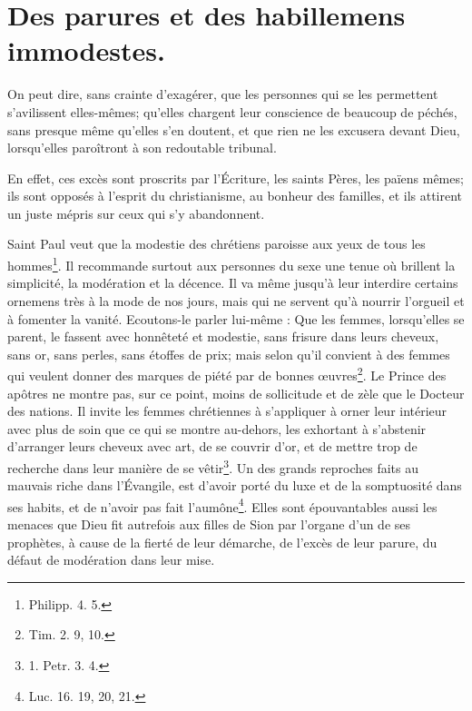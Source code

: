 \documentclass[instructions.tex]{subfiles}
\begin{document}
 
\chapter{Des parures et des habillemens immodestes.}
 
On peut dire, sans crainte d'exagérer, que les personnes qui se les permettent s'avilissent elles-mêmes; qu'elles chargent leur conscience de beaucoup de péchés, sans presque même qu'elles s'en doutent, et que rien ne les excusera devant Dieu, lorsqu'elles paroîtront à son redoutable tribunal.
 
\primo En effet, ces excès sont proscrits par l'Écriture, les saints Pères, les païens mêmes; ils sont opposés à l'esprit du christianisme, au bonheur des familles, et ils attirent un juste mépris sur ceux qui s'y abandonnent.
 
Saint Paul veut que la modestie des chrétiens paroisse aux yeux de tous les hommes\footnote{Philipp. 4. 5.}. Il recommande surtout aux personnes du sexe une tenue où brillent la simplicité, la modération et la décence. Il va même jusqu'à leur interdire certains ornemens très à la mode de nos jours, mais qui ne servent qu'à nourrir l'orgueil et à fomenter la vanité. Ecoutons-le parler lui-même : Que les femmes, lorsqu'elles se parent, le fassent avec honnêteté et modestie, sans frisure dans leurs cheveux, sans or, sans perles, sans étoffes de prix; mais selon qu'il convient à des femmes qui veulent donner des marques de piété par de bonnes œuvres\footnote{Tim. 2. 9, 10.}. Le Prince des apôtres ne montre pas, sur ce point, moins de sollicitude et de zèle que le Docteur des nations. Il invite les femmes chrétiennes à s'appliquer à orner leur intérieur avec plus de soin que ce qui se montre au-dehors, les exhortant à s'abstenir d'arranger leurs cheveux avec art, de se couvrir d'or, et de mettre trop de recherche dans leur manière de se vêtir\footnote{1. Petr. 3. 4.}. Un des grands reproches faits au mauvais riche dans l'Évangile, est d'avoir porté du luxe et de la somptuosité dans ses habits, et de n'avoir pas fait l'aumône\footnote{Luc. 16. 19, 20, 21.}. Elles sont épouvantables aussi les menaces que Dieu fit autrefois aux filles de Sion par l'organe d'un de ses prophètes, à cause de la fierté de leur démarche, de l'excès de leur parure, du défaut de modération dans leur mise.
 
\end{document}
